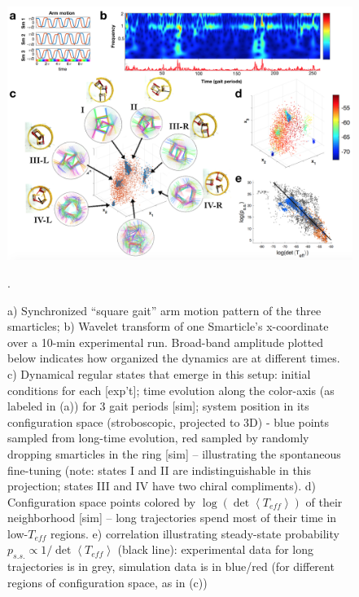 \documentclass[reprint,prx]{revtex4-1}
\renewcommand{\=}[1]{\stackrel{#1}{=}} %
\renewcommand{\(}{\left (}
\renewcommand{\)}{\right  )}
\renewcommand{\[}{\left [}
\renewcommand{\]}{\right ]}
\newcommand{\<}{\left <}
\renewcommand{\>}{\right >}
\theoremstyle{definition}
\theoremstyle{remark}
\begin{document}
\begin{figure}
	\includegraphics[width=1\textwidth]{3regularization.png}
	\caption{a) Synchronized ``square gait'' arm motion pattern of the three smarticles; b) Wavelet transform of one Smarticle's x-coordinate over a 10-min experimental run. Broad-band amplitude plotted below indicates how organized the dynamics are at different times. c) Dynamical regular states that emerge in this setup: initial conditions for each [exp't]; time evolution along the color-axis (as labeled in (a)) for 3 gait periods [sim]; system position in its configuration space (stroboscopic, projected to 3D) - blue points sampled from long-time evolution, red sampled by randomly dropping smarticles in the ring [sim] -- illustrating the spontaneous fine-tuning (note: states I and II are indistinguishable in this projection; states III and IV have two chiral compliments). d) Configuration space points colored by $\log(\det \<T_{eff}\>)$ of their neighborhood [sim] -- long trajectories spend most of their time in low-$T_{eff}$ regions. e) correlation illustrating steady-state probability $p_{s.s.} \propto 1/\det \<T_{eff}\>$ (black line): experimental data for long trajectories is in grey, simulation data is in blue/red (for different regions of configuration space, as in (c))}.
	\label{fig:reg}
\end{figure}
\end{document}
